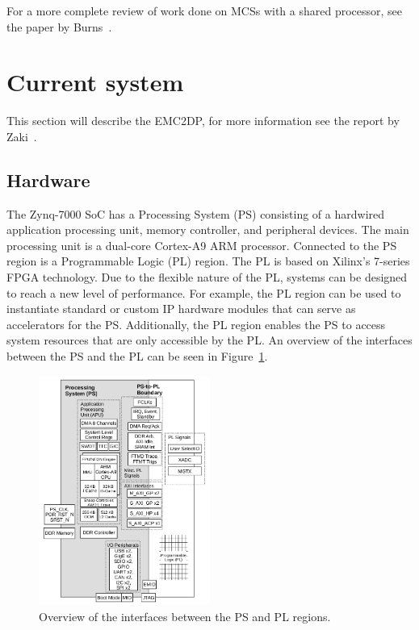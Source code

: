 For a more complete review of work done on MCSs with a shared processor, see the paper by Burns~\cite{burns2016}.




\section{Current system}
\label{sec:lit_emc2mcs}
This section will describe the EMC2DP, for more information see the report by Zaki~\cite{zaki2016}.

\subsection{Hardware}
The Zynq-7000 SoC has a Processing System (PS) consisting of a hardwired application processing unit, memory controller, and peripheral devices. The main processing unit is a dual-core Cortex-A9 ARM processor. Connected to the PS region is a Programmable Logic (PL) region. The PL is based on Xilinx’s 7-series FPGA technology. 
Due to the flexible nature of the PL, systems can be designed to reach a new level of performance. For example, the PL region can be used to instantiate standard or custom IP hardware modules that can serve as accelerators for the PS. Additionally, the PL region enables the PS to access system resources that are only accessible by the PL. %
An overview of the interfaces between the PS and the PL can be seen in Figure~\ref{fig:interface}.

\begin{figure}[H]
\centering
\includegraphics[width=0.5\textwidth]{./img/literature_interface.png}
\caption{Overview of the interfaces between the PS and PL regions.\cite{zaki2016}}\label{fig:interface}
\end{figure}


